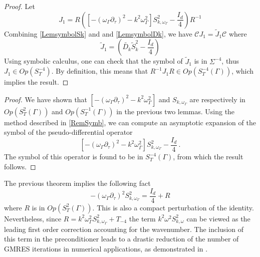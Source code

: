 \documentclass[a4paper]{article}
\begin{document}
\begin{proof}
	Let 
	\[J_1 =R \left(\left[-(\omega_\Gamma \partial_\tau)^2 - k^2\omega_\Gamma^2\right] S_{k,\omega_\Gamma}^2 - \frac{I_d}{4}\right) R^{-1}\]
	Combining \autoref{LemsymbolSk} and and \autoref{LemsymbolDk}, we have $\mathcal{C} J_1 = \tilde{J}_1\mathcal{C}$ where 
	\[\tilde{J}_1 = \left(\tilde{D_k} \tilde{S}_k^2  - \frac{I_d}{4}\right)\]
	Using symbolic calculus, one can check that the symbol of $\tilde{J}_1$ is in $\Sigma^{-4}$, thus $J_1 \in \textit{Op}(S^{-4}_T)$. By definition, this means that $R^{-1}J_1 R \in \textit{Op}(S_T^{-4}(\Gamma))$, which implies the result.  
\end{proof}
\begin{proof}
	We have shown that $\left[-(\omega_\Gamma \partial_\tau)^2 - k^2\omega_\Gamma^2\right]$ and  $S_{k,\omega_\Gamma}$ are respectively in $\textit{Op}(S^{2}_T(\Gamma))$ and $\textit{Op}(S^{-1}_T(\Gamma))$ in the previous two lemmas. Using the method described in \autoref{RemSymb}, we can compute an asymptotic expansion of the symbol of the pseudo-differential operator \[\left[-(\omega_\Gamma \partial_\tau)^2 - k^2\omega_\Gamma^2\right]S_{k,\omega_\Gamma}^2 - \frac{I_d}{4}\,.\] 
	The symbol of this operator is found to be in $S^{-4}_T(\Gamma)$, from which the result follows.  
\end{proof}
\begin{Rem}
	The previous theorem implies the following fact
	\[-(\omega_\Gamma \partial_\tau)^2 S_{k,\omega_\Gamma}^2 = \frac{I_d}{4} + R\]
	where $R$ is in $\textit{Op}(S^2_T(\Gamma))$. This is also a compact perturbation of the identity. Nevertheless, since $R = k^2 \omega_\Gamma^2 S_{k,\omega_\Gamma}^2 + T_{-4}$ the term $k^2 \omega^2S_{k,\omega}^2$ can be viewed as the leading first order correction accounting for the wavenumber. The inclusion of this term in the preconditioner leads to a drastic reduction of the number of GMRES iterations in numerical applications, as demonstrated in \cite{alouges2018new}. 
\end{Rem}
\end{document}
